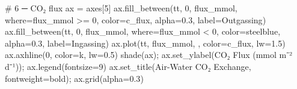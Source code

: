 \documentclass[
  letterpaper,
  DIV=11,
  numbers=noendperiod]{scrartcl}
\newenvironment{Shaded}{\begin{snugshade}}{\end{snugshade}}
\newcommand{\CommentTok}[1]{\textcolor[rgb]{0.37,0.37,0.37}{#1}}
\newcommand{\DecValTok}[1]{\textcolor[rgb]{0.68,0.00,0.00}{#1}}
\newcommand{\FloatTok}[1]{\textcolor[rgb]{0.68,0.00,0.00}{#1}}
\newcommand{\NormalTok}[1]{\textcolor[rgb]{0.00,0.23,0.31}{#1}}
\newcommand{\OperatorTok}[1]{\textcolor[rgb]{0.37,0.37,0.37}{#1}}
\newcommand{\StringTok}[1]{\textcolor[rgb]{0.13,0.47,0.30}{#1}}
\begin{document}
\begin{Shaded}
\begin{Highlighting}[]
\CommentTok{\# 6 ─ CO₂ flux}
\NormalTok{ax }\OperatorTok{=}\NormalTok{ axes[}\DecValTok{5}\NormalTok{]}
\NormalTok{ax.fill\_between(tt, }\DecValTok{0}\NormalTok{, flux\_mmol, where}\OperatorTok{=}\NormalTok{flux\_mmol }\OperatorTok{\textgreater{}=} \DecValTok{0}\NormalTok{,}
\NormalTok{                color}\OperatorTok{=}\NormalTok{c\_flux, alpha}\OperatorTok{=}\FloatTok{0.3}\NormalTok{, label}\OperatorTok{=}\StringTok{\textquotesingle{}Outgassing\textquotesingle{}}\NormalTok{)}
\NormalTok{ax.fill\_between(tt, }\DecValTok{0}\NormalTok{, flux\_mmol, where}\OperatorTok{=}\NormalTok{flux\_mmol }\OperatorTok{\textless{}} \DecValTok{0}\NormalTok{,}
\NormalTok{                color}\OperatorTok{=}\StringTok{\textquotesingle{}steelblue\textquotesingle{}}\NormalTok{, alpha}\OperatorTok{=}\FloatTok{0.3}\NormalTok{, label}\OperatorTok{=}\StringTok{\textquotesingle{}Ingassing\textquotesingle{}}\NormalTok{)}
\NormalTok{ax.plot(tt, flux\_mmol, }\StringTok{\textquotesingle{}{-}\textquotesingle{}}\NormalTok{, color}\OperatorTok{=}\NormalTok{c\_flux, lw}\OperatorTok{=}\FloatTok{1.5}\NormalTok{)}
\NormalTok{ax.axhline(}\DecValTok{0}\NormalTok{, color}\OperatorTok{=}\StringTok{\textquotesingle{}k\textquotesingle{}}\NormalTok{, lw}\OperatorTok{=}\FloatTok{0.5}\NormalTok{)}
\NormalTok{shade(ax)}\OperatorTok{;}\NormalTok{ ax.set\_ylabel(}\StringTok{\textquotesingle{}CO₂ Flux (mmol m⁻² d⁻¹)\textquotesingle{}}\NormalTok{)}\OperatorTok{;}\NormalTok{ ax.legend(fontsize}\OperatorTok{=}\DecValTok{9}\NormalTok{)}
\NormalTok{ax.set\_title(}\StringTok{\textquotesingle{}Air{-}Water CO₂ Exchange\textquotesingle{}}\NormalTok{, fontweight}\OperatorTok{=}\StringTok{\textquotesingle{}bold\textquotesingle{}}\NormalTok{)}\OperatorTok{;}\NormalTok{ ax.grid(alpha}\OperatorTok{=}\FloatTok{0.3}\NormalTok{)}


\end{Highlighting}
\end{Shaded}
\end{document}
